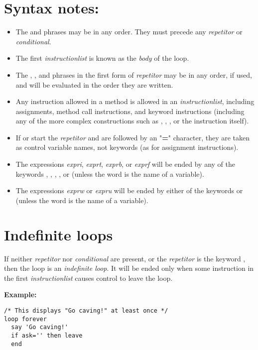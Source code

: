 \section{Syntax notes:}
\begin{itemize}
\item 
The  and  phrases may be in any order.
They must precede any \emph{repetitor} or \emph{conditional}.
\item 
{}
The first \emph{instructionlist} is known as the \emph{body} of
the loop.
\item 
The , , and  phrases in the first form
of \emph{repetitor} may be in any order, if used, and will be
evaluated in the order they are written.
\item 
Any instruction allowed in a method is allowed in an
\emph{instructionlist}, including assignments, method call
instructions, and keyword instructions (including any of the more
complex constructions such as , , ,
or the  instruction itself).
\item 
If  or  start the \emph{repetitor} and
are followed by an "\textbf{=}" character, they are taken as
control variable names, not keywords (as for assignment instructions).
\item 
The expressions \emph{expri}, \emph{exprt}, \emph{exprb}, or
\emph{exprf} will be ended by any of the keywords ,
, , , or  (unless
the word is the name of a variable).
\item 
The expressions \emph{exprw} or \emph{expru} will be ended by
either of the keywords  or  (unless the
word is the name of a variable).
\end{itemize}
\section{Indefinite loops}
 If neither \emph{repetitor} nor \emph{conditional} are
present, or the \emph{repetitor} is the keyword ,
then the loop is an \emph{indefinite loop}.
It will be ended only when some instruction in the first
\emph{instructionlist} causes control to leave the loop.

\textbf{Example:}
\begin{lstlisting}
/* This displays "Go caving!" at least once */
loop forever
  say 'Go caving!'
  if ask='' then leave
  end
\end{lstlisting}
